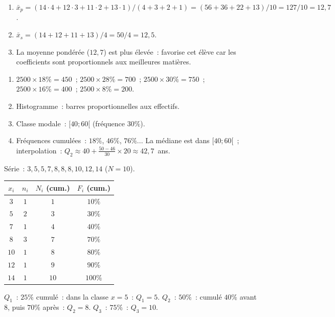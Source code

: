 
\begin{enumerate}
  \item $\bar{x}_p=(14\cdot4+12\cdot3+11\cdot2+13\cdot1)/(4+3+2+1)=(56+36+22+13)/10=127/10=12{,}7$.
  \item $\bar{x}_s=(14+12+11+13)/4=50/4=12{,}5$.
  \item La moyenne pond\'er\'ee ($12{,}7$) est plus \'elev\'ee~: favorise cet \'el\`eve
        car les coefficients sont proportionnels aux meilleures mati\`eres.
\end{enumerate}


\begin{enumerate}
  \item $2500\times18\%=450$~; $2500\times28\%=700$~; $2500\times30\%=750$~;
        $2500\times16\%=400$~; $2500\times8\%=200$.
  \item Histogramme~: barres proportionnelles aux effectifs.
  \item Classe modale~: $[40;60[$ (fr\'equence $30\%$).
  \item Fr\'equences cumul\'ees~: $18\%$, $46\%$, $76\%$...
        La m\'ediane est dans $[40;60[$~; interpolation~:
        $Q_2\approx40+\frac{50-46}{30}\times20\approx42{,}7$~ans.
\end{enumerate}


S\'erie~: $3,5,5,7,8,8,8,10,12,14$ ($N=10$).

\begin{center}
\begin{tabular}{|c|c|c|c|}
\hline
$x_i$ & $n_i$ & $N_i$ (cum.) & $F_i$ (cum.) \\\hline
$3$ & $1$ & $1$ & $10\%$ \\
$5$ & $2$ & $3$ & $30\%$ \\
$7$ & $1$ & $4$ & $40\%$ \\
$8$ & $3$ & $7$ & $70\%$ \\
$10$ & $1$ & $8$ & $80\%$ \\
$12$ & $1$ & $9$ & $90\%$ \\
$14$ & $1$ & $10$ & $100\%$ \\\hline
\end{tabular}
\end{center}
$Q_1$~: $25\%$ cumul\'e~: dans la classe $x=5$~: $Q_1=5$.
$Q_2$~: $50\%$~: cumul\'e $40\%$ avant $8$, puis $70\%$ apr\`es~: $Q_2=8$.
$Q_3$~: $75\%$~: $Q_3=10$.

